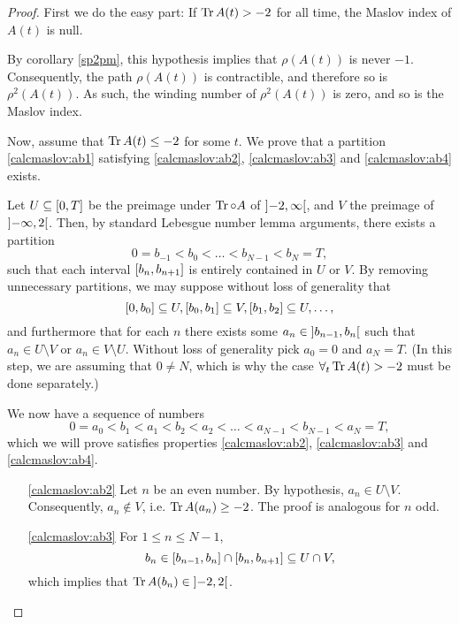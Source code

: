 \begin{proof}
First we do the easy part: If $\operatorname{Tr} A(t) > -2$ for all time, the Maslov index of $A(t)$ is null.

By corollary \ref{sp2pm}, this hypothesis implies that $\rho(A(t))$ is never $-1$. Consequently, the path $\rho(A(t))$ is contractible, and therefore so is $\rho^2(A(t))$. As such, the winding number of $\rho^2(A(t))$ is zero, and so is the Maslov index.

Now, assume that $\operatorname{Tr} A(t) \leq -2$ for some $t$. We prove that a partition \eqref{calcmaslov:ab1} satisfying \ref{calcmaslov:ab2}, \ref{calcmaslov:ab3} and \ref{calcmaslov:ab4} exists.

Let $U \subseteq \interval 0 T$ be the preimage under $\operatorname{Tr} \circ A$ of $\ointerval{-2}\infty$, and $V$ the preimage of $\ointerval{-\infty}2$. Then, by standard Lebesgue number lemma arguments, there exists a partition 
\begin{equation}
0 = b_{-1} < b_0 < \dots < b_{N-1} < b_N = T,
\end{equation}
such that each interval $\interval{b_n}{b_{n+1}}$ is entirely contained in $U$ or $V$. By removing unnecessary partitions, we may suppose without loss of generality that
\begin{equation}
\interval{0}{b_0} \subseteq U, \interval{b_0}{b_1} \subseteq V, \interval{b_1}{b_2} \subseteq U, \dots,
\end{equation}
and furthermore that for each $n$ there exists some $a_n \in \ointerval{b_{n-1}}{b_{n}}$ such that $a_n \in U \setminus V$ or $a_n \in V \setminus U$. Without loss of generality pick $a_0 = 0$ and $a_N = T$. (In this step, we are assuming that $0 \neq N$, which is why the case $\forall_t \operatorname{Tr} A(t) > -2$ must be done separately.)

We now have a sequence of numbers
\begin{equation}\label{tcineq}
0 = a_0 < b_1 < a_1 < b_2 < a_2 < \dots < a_{N-1} < b_{N-1} < a_{N} = T,
\end{equation}
which we will prove satisfies properties \ref{calcmaslov:ab2}, \ref{calcmaslov:ab3} and \ref{calcmaslov:ab4}.

\begin{itemize}
\item [\ref{calcmaslov:ab2}] Let $n$ be an even number. By hypothesis, $a_n \in U \setminus V$. Consequently, $a_n \not \in V$, i.e. $\operatorname{Tr} A(a_n) \geq -2$. The proof is analogous for $n$ odd.

\item [\ref{calcmaslov:ab3}] For $1 \leq n \leq N-1$,
\begin{equation}
b_n \in \interval{b_{n-1}}{b_n} \cap \interval{b_n}{b_{n+1}} \subseteq U \cap V,
\end{equation}
which implies that $\trace A(b_n) \in \ointerval{-2}2$.


\end{itemize}
\end{proof}
